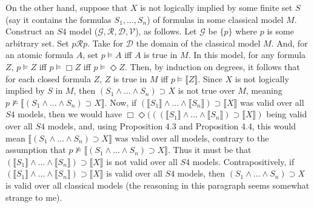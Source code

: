 \documentclass{article}
\newcommand{\lbc}{\llbracket}
\newcommand{\rbc}{\rrbracket}
\theoremstyle{definition}
\begin{document}
On the other hand, suppose that $X$ is not logically implied by some finite set $S$ (say it contains the formulas $S_1,...,S_n$)
of formulas in some classical model $M$. Construct 
an $S4$ model ($\mathcal{G},\mathcal{R},\mathcal{D},\mathcal{V}$), as follows. Let $\mathcal{G}$ be $\{p\}$ where $p$ is some 
arbitrary set. Set $p\mathcal{R}p$. Take for $\mathcal{D}$ the domain of the classical model $M$. And, for an atomic formula 
$A$, set $p\vDash A$ iff $A$ is true in $M$. In this model, for any formula $Z$, $p\vDash Z$ iff $p\vDash\Box Z$ iff $p\vDash\Diamond Z$. Then,
by induction on degrees, it follows that for each closed formula $Z$, $Z$ is true in $M$ iff $p\vDash\lbc Z\rbc$. Since 
$X$ is not logically implied by $S$ in $M$, then $(S_1\wedge...\wedge S_n)\supset X$ is not true over $M$, meaning 
$p\nvDash\lbc (S_1\wedge...\wedge S_n)\supset X\rbc$. Now, if $(\lbc S_1\rbc\wedge...\wedge\lbc S_n\rbc)\supset\lbc X\rbc$ was valid over 
all $S4$ models, then we would have $\Box\Diamond(((\lbc S_1\rbc\wedge...\wedge\lbc S_n\rbc)\supset\lbc X\rbc)$ being valid over all 
$S4$ models, and, using Proposition 4.3 and Proposition 4.4, this would mean $\lbc (S_1\wedge...\wedge S_n)\supset X\rbc$ was valid over 
all models, contrary to the assumption that $p\nvDash\lbc (S_1\wedge...\wedge S_n)\supset X\rbc$. Thus it must be that 
$(\lbc S_1\rbc\wedge...\wedge\lbc S_n\rbc)\supset\lbc X\rbc$ is not valid over all $S4$ models. Contrapositively, 
if $(\lbc S_1\rbc\wedge...\wedge\lbc S_n\rbc)\supset\lbc X\rbc$ is valid over all $S4$ models, then $(S_1\wedge...\wedge S_n)\supset X$ is 
valid over all classical models (the reasoning in this paragraph seems somewhat strange to me). 
\end{document}
